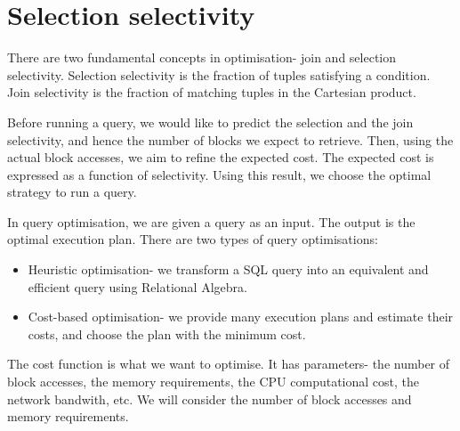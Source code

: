 \documentclass[a4paper, openany]{memoir}
\theoremstyle{definition}
\theoremstyle{plain}
\begin{document}
\newpage

\section{Selection selectivity}
There are two fundamental concepts in optimisation- join and selection selectivity. Selection selectivity is the fraction of tuples satisfying a condition. Join selectivity is the fraction of matching tuples in the Cartesian product.

Before running a query, we would like to predict the selection and the join selectivity, and hence the number of blocks we expect to retrieve. Then, using the actual block accesses, we aim to refine the expected cost. The expected cost is expressed as a function of selectivity. Using this result, we choose the optimal strategy to run a query.

In query optimisation, we are given a query as an input. The output is the optimal execution plan. There are two types of query optimisations:
\begin{itemize}
    \item Heuristic optimisation- we transform a SQL query into an equivalent and efficient query using Relational Algebra.
    \item Cost-based optimisation- we provide many execution plans and estimate their costs, and choose the plan with the minimum cost.
\end{itemize}
The cost function is what we want to optimise. It has parameters- the number of block accesses, the memory requirements, the CPU computational cost, the network bandwith, etc. We will consider the number of block accesses and memory requirements. 
\end{document}
